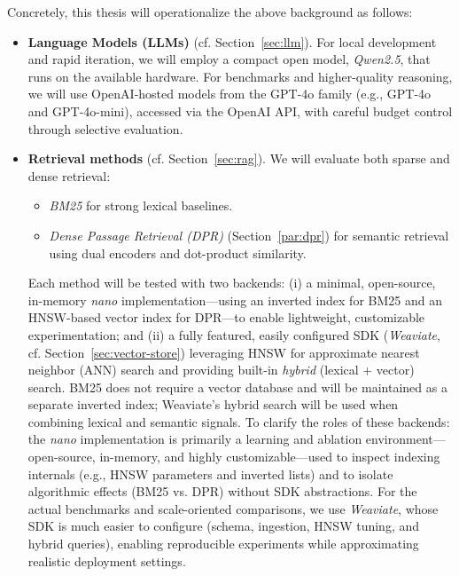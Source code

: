 

Concretely, this thesis will operationalize the above background as follows:
\begin{itemize}
    \item \textbf{Language Models (\glspl{LLM})} (cf. Section~\ref{sec:llm}). For local development and rapid iteration, we will employ a compact open model, \emph{Qwen2.5}, that runs on the available hardware. For benchmarks and higher-quality reasoning, we will use OpenAI-hosted models from the GPT-4o family (e.g., GPT-4o and GPT-4o-mini), accessed via the OpenAI API, with careful budget control through selective evaluation.

    \item \textbf{Retrieval methods} (cf. Section~\ref{sec:rag}). We will evaluate both sparse and dense retrieval:
    \begin{itemize}
        \item \emph{BM25} for strong lexical baselines.
        \item \emph{Dense Passage Retrieval (DPR)} (Section~\ref{par:dpr}) for semantic retrieval using dual encoders and dot-product similarity.
    \end{itemize}
    Each method will be tested with two backends: (i) a minimal, open-source, in-memory \emph{nano} implementation---using an inverted index for BM25 and an HNSW-based vector index for DPR---to enable lightweight, customizable experimentation; and (ii) a fully featured, easily configured SDK (\emph{Weaviate}, cf. Section~\ref{sec:vector-store}) leveraging HNSW for approximate nearest neighbor (\gls{ANN}) search and providing built-in \emph{hybrid} (lexical + vector) search. BM25 does not require a vector database and will be maintained as a separate inverted index; Weaviate's hybrid search will be used when combining lexical and semantic signals.
    To clarify the roles of these backends: the \emph{nano} implementation is primarily a learning and ablation environment---open-source, in-memory, and highly customizable---used to inspect indexing internals (e.g., \gls{HNSW} parameters and inverted lists) and to isolate algorithmic effects (BM25 vs. DPR) without SDK abstractions. For the actual benchmarks and scale-oriented comparisons, we use \emph{Weaviate}, whose SDK is much easier to configure (schema, ingestion, \gls{HNSW} tuning, and hybrid queries), enabling reproducible experiments while approximating realistic deployment settings.


\end{itemize}
